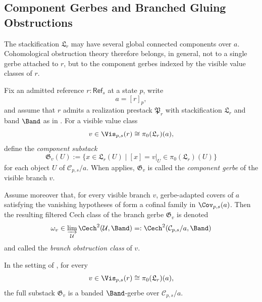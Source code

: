 \subsection{Component Gerbes and Branched Gluing Obstructions}\label{sec:gerbe-obstruction}

The stackification $\mathfrak L_r$ may have several global connected components over $a$. Cohomological obstruction theory therefore belongs, in general, not to a single gerbe attached to $r$, but to the component gerbes indexed by the visible value classes of $r$.

\begin{definition}\label{def:compatible-realization-stack}\label{def:cech-gluing-obstruction}
Fix an admitted reference $r:\mathsf{Ref}_s$ at a state $p$, write
\[
a=[r]_p,
\]
and assume that $r$ admits a realization prestack $\mathfrak P_r$ with stackification $\mathfrak L_r$ and band $\Band$ as in . For a visible value class
\[
v\in \Vis_{p,s}(r)\cong \pi_0(\mathfrak L_r)(a),
\]
define the \emph{component substack}
\[
\mathfrak G_v(U):=\{x\in \mathfrak L_r(U)\mid [x]=v|_U\in \pi_0(\mathfrak L_r)(U)\}
\]
for each object $U$ of $\mathcal C_{p,s}/a$. When  applies, $\mathfrak G_v$ is called the \emph{component gerbe} of the visible branch $v$.

Assume moreover that, for every visible branch $v$, gerbe-adapted covers of $a$ satisfying the vanishing hypotheses of  form a cofinal family in $\Cov_{p,s}(a)$. Then the resulting filtered Cech class of the branch gerbe $\mathfrak G_v$ is denoted
\[
\omega_v\in \varinjlim_{\mathcal U}\Cech^2(\mathcal U,\Band)=:\Cech^2(\mathcal C_{p,s}/a,\Band)
\]
and called the \emph{branch obstruction class} of $v$.
\end{definition}

\begin{theorem}\label{thm:component-gerbe-decomposition}
In the setting of , for every
\[
v\in \Vis_{p,s}(r)\cong \pi_0(\mathfrak L_r)(a),
\]
the full substack $\mathfrak G_v$ is a banded $\Band$-gerbe over $\mathcal C_{p,s}/a$.
\end{theorem}

